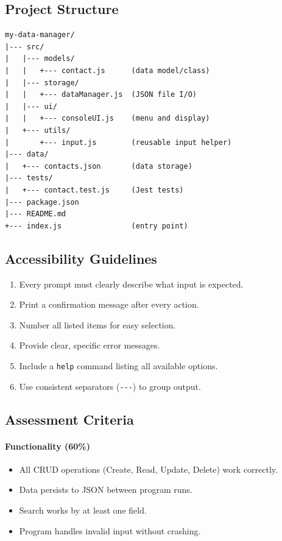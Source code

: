 \documentclass[
  justified,
  openright,
]{tufte-book}
\let\subsubsection\paragraph
\let\paragraph\paragraph
\let\subsubsection\paragraph
\let\paragraph\paragraph
\providecommand{\tightlist}{%
  \setlength{\itemsep}{0pt}\setlength{\parskip}{0pt}}
\begin{document}
\subsection{Project Structure}\label{project-structure}

\begin{verbatim}
my-data-manager/
|--- src/
|   |--- models/
|   |   +--- contact.js      (data model/class)
|   |--- storage/
|   |   +--- dataManager.js  (JSON file I/O)
|   |--- ui/
|   |   +--- consoleUI.js    (menu and display)
|   +--- utils/
|       +--- input.js        (reusable input helper)
|--- data/
|   +--- contacts.json       (data storage)
|--- tests/
|   +--- contact.test.js     (Jest tests)
|--- package.json
|--- README.md
+--- index.js                (entry point)
\end{verbatim}

\subsection{Accessibility Guidelines}\label{accessibility-guidelines}

\begin{enumerate}
\def\labelenumi{\arabic{enumi}.}
\tightlist
\item
  Every prompt must clearly describe what input is expected.
\item
  Print a confirmation message after every action.
\item
  Number all listed items for easy selection.
\item
  Provide clear, specific error messages.
\item
  Include a \texttt{help} command listing all available options.
\item
  Use consistent separators (\texttt{-\/-\/-}) to group output.
\end{enumerate}

\subsection{Assessment Criteria}\label{assessment-criteria}

\subsubsection{Functionality (60\%)}\label{functionality-60}

\begin{itemize}
\tightlist
\item[$\square$]
  All CRUD operations (Create, Read, Update, Delete) work correctly.
\item[$\square$]
  Data persists to JSON between program runs.
\item[$\square$]
  Search works by at least one field.
\item[$\square$]
  Program handles invalid input without crashing.
\end{itemize}
\end{document}
